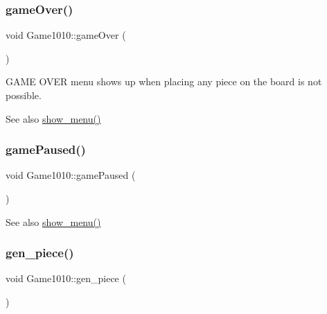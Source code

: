 \subsubsection{\texorpdfstring{game\+Over()}{gameOver()}}
{\footnotesize\ttfamily void Game1010\+::game\+Over (\begin{DoxyParamCaption}{ }\end{DoxyParamCaption})\hspace{0.3cm}{\ttfamily [inline]}}



G\+A\+ME O\+V\+ER menu shows up when placing any piece on the board is not possible. 

\begin{DoxySeeAlso}{See also}
\mbox{\hyperlink{class_game1010_a99d6f53c3073861fe37ef67caa073840}{show\+\_\+menu()}} 
\end{DoxySeeAlso}
\mbox{\label{class_game1010_ab9c6def8a07ae00b55bd9b51f407eecd}} 
\subsubsection{\texorpdfstring{game\+Paused()}{gamePaused()}}
{\footnotesize\ttfamily void Game1010\+::game\+Paused (\begin{DoxyParamCaption}{ }\end{DoxyParamCaption})\hspace{0.3cm}{\ttfamily [inline]}}

\begin{DoxySeeAlso}{See also}
\mbox{\hyperlink{class_game1010_a99d6f53c3073861fe37ef67caa073840}{show\+\_\+menu()}} 
\end{DoxySeeAlso}
\mbox{\label{class_game1010_a9576170947a355682c922cb648432b9e}} 
\subsubsection{\texorpdfstring{gen\+\_\+piece()}{gen\_piece()}}
{\footnotesize\ttfamily void Game1010\+::gen\+\_\+piece (\begin{DoxyParamCaption}{ }\end{DoxyParamCaption})\hspace{0.3cm}{\ttfamily [inline]}}



